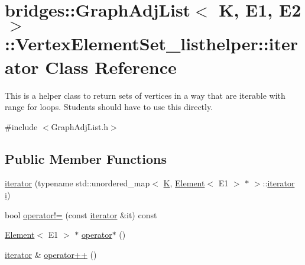 \hypertarget{classbridges_1_1_graph_adj_list_1_1_vertex_element_set__listhelper_1_1iterator}{}\section{bridges\+:\+:Graph\+Adj\+List$<$ K, E1, E2 $>$\+:\+:Vertex\+Element\+Set\+\_\+listhelper\+:\+:iterator Class Reference}
\label{classbridges_1_1_graph_adj_list_1_1_vertex_element_set__listhelper_1_1iterator}


This is a helper class to return sets of vertices in a way that are iterable with range for loops. Students should have to use this directly.  




{\ttfamily \#include $<$Graph\+Adj\+List.\+h$>$}

\subsection*{Public Member Functions}
\begin{DoxyCompactItemize}
\item 
\hyperlink{classbridges_1_1_graph_adj_list_1_1_vertex_element_set__listhelper_1_1iterator_a73bc4be2fe2dc6edb80bc9bae4ac3581}{iterator} (typename std\+::unordered\+\_\+map$<$ \hyperlink{namespacebridges_acfb0a4f7877d8f63de3e6862004c50edaa5f3c6a11b03839d46af9fb43c97c188}{K}, \hyperlink{classbridges_1_1_element}{Element}$<$ E1 $>$ $\ast$ $>$\+::\hyperlink{classbridges_1_1_graph_adj_list_1_1_vertex_element_set__listhelper_1_1iterator}{iterator} \hyperlink{namespacebridges_acfb0a4f7877d8f63de3e6862004c50eda865c0c0b4ab0e063e5caa3387c1a8741}{i})
\item 
bool \hyperlink{classbridges_1_1_graph_adj_list_1_1_vertex_element_set__listhelper_1_1iterator_a559f32f0f60269d7d8b793e197e9b0ba}{operator!=} (const \hyperlink{classbridges_1_1_graph_adj_list_1_1_vertex_element_set__listhelper_1_1iterator}{iterator} \&it) const
\item 
\hyperlink{classbridges_1_1_element}{Element}$<$ E1 $>$ $\ast$ \hyperlink{classbridges_1_1_graph_adj_list_1_1_vertex_element_set__listhelper_1_1iterator_ae7fce2fcbae316535cc6d282ccf5290b}{operator$\ast$} ()
\item 
\hyperlink{classbridges_1_1_graph_adj_list_1_1_vertex_element_set__listhelper_1_1iterator}{iterator} \& \hyperlink{classbridges_1_1_graph_adj_list_1_1_vertex_element_set__listhelper_1_1iterator_ad0d28c10ae2a8a5592ccda4b659fd638}{operator++} ()
\end{DoxyCompactItemize}



